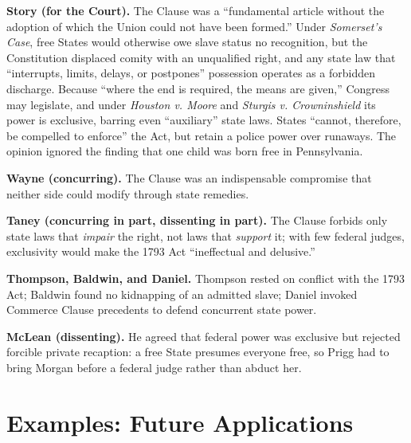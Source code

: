 \documentclass[12pt]{article}
\begin{document}
\textbf{Story (for the Court).} The Clause was a ``fundamental article without the adoption of which the Union could not have been formed.'' Under \textit{Somerset's Case}, free States would otherwise owe slave status no recognition, but the Constitution displaced comity with an unqualified right, and any state law that ``interrupts, limits, delays, or postpones'' possession operates as a forbidden discharge. Because ``where the end is required, the means are given,'' Congress may legislate, and under \textit{Houston v. Moore} and \textit{Sturgis v. Crowninshield} its power is exclusive, barring even ``auxiliary'' state laws. States ``cannot, therefore, be compelled to enforce'' the Act, but retain a police power over runaways. The opinion ignored the finding that one child was born free in Pennsylvania.

\textbf{Wayne (concurring).} The Clause was an indispensable compromise that neither side could modify through state remedies.

\textbf{Taney (concurring in part, dissenting in part).} The Clause forbids only state laws that \textit{impair} the right, not laws that \textit{support} it; with few federal judges, exclusivity would make the 1793 Act ``ineffectual and delusive.''

\textbf{Thompson, Baldwin, and Daniel.} Thompson rested on conflict with the 1793 Act; Baldwin found no kidnapping of an admitted slave; Daniel invoked Commerce Clause precedents to defend concurrent state power.

\textbf{McLean (dissenting).} He agreed that federal power was exclusive but rejected forcible private recaption: a free State presumes everyone free, so Prigg had to bring Morgan before a federal judge rather than abduct her.

\section{Examples: Future Applications}
\end{document}
